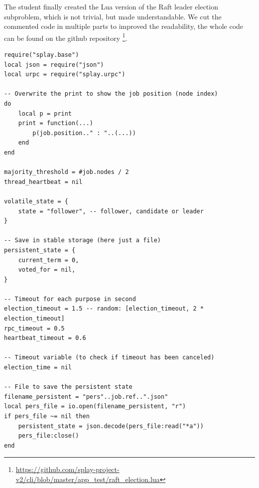 \documentclass{eplmastersthesis}
\begin{document}
        The student finally created the Lua version of the Raft leader
        election subproblem, which is not trivial, but made
        understandable. We cut the commented code in multiple parts to improved the readability,
        the whole code can be found on the github repository
        \footnote{\url{https://github.com/splay-project-v2/cli/blob/master/app_test/raft_election.lua}}.

        \begin{minipage}{\linewidth}
        \begin{lstlisting}[style=MySmallLua,caption={Initialisation}]
require("splay.base")
local json = require("json")
local urpc = require("splay.urpc")

-- Overwrite the print to show the job position (node index)
do
	local p = print
	print = function(...)
		p(job.position.." : "..(...))
	end
end

majority_threshold = #job.nodes / 2
thread_heartbeat = nil

volatile_state = {
    state = "follower", -- follower, candidate or leader
}

-- Save in stable storage (here just a file)
persistent_state = {
    current_term = 0,
    voted_for = nil,
}

-- Timeout for each purpose in second
election_timeout = 1.5 -- random: [election_timeout, 2 * election_timeout]
rpc_timeout = 0.5
heartbeat_timeout = 0.6

-- Timeout variable (to check if timeout has been canceled)
election_time = nil

-- File to save the persistent state
filename_persistent = "pers"..job.ref..".json"
local pers_file = io.open(filename_persistent, "r")
if pers_file ~= nil then
    persistent_state = json.decode(pers_file:read("*a"))
    pers_file:close()
end
        \end{lstlisting}
        \end{minipage}
\end{document}
